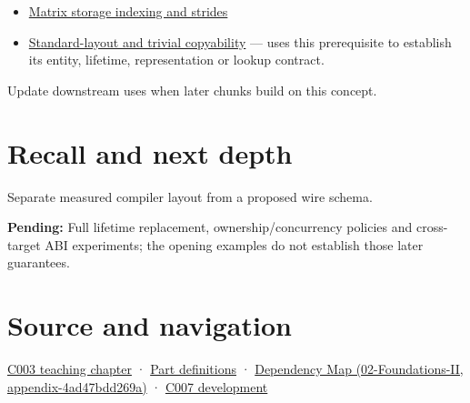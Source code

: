 \begin{itemize}
\item
  \hyperref[appendix-ffdc1d4e5350]{Matrix storage indexing and strides}
\item
  \hyperref[appendix-958870a64c53]{Standard-layout and trivial copyability} --- uses this prerequisite to establish its entity, lifetime, representation or lookup contract.
\end{itemize}

Update downstream uses when later chunks build on this concept.

\section{Recall and next depth}\label{appendix-c4ac6bb0fff8-recall-and-next-depth}

Separate measured compiler layout from a proposed wire schema.

\textbf{Pending:} Full lifetime replacement, ownership/concurrency policies and cross-target ABI experiments; the opening examples do not establish those later guarantees.

\section{Source and navigation}\label{appendix-c4ac6bb0fff8-source-and-navigation}

\href{Continuous\%20Notes/Computing\%20Foundations\%20-\%20From\%20Bits\%20to\%20C++\%20and\%20Systems\%20APIs\#Where\%20the\%20bytes\%20live}{C003 teaching chapter} · \hyperref[appendix-fd090d982a15-m003---parts-41-60]{Part definitions} · \href{../02-Foundations-II/main.pdf\#nameddest=appendix-4ad47bdd269a}{Dependency Map (02-Foundations-II, appendix-4ad47bdd269a)} · \href{Continuous\%20Notes/Computing\%20Foundations\%20-\%20From\%20Bits\%20to\%20C++\%20and\%20Systems\%20APIs\#Bringing\%20the\%20object\%20model\%20back\%20to\%20bytes}{C007 development}
